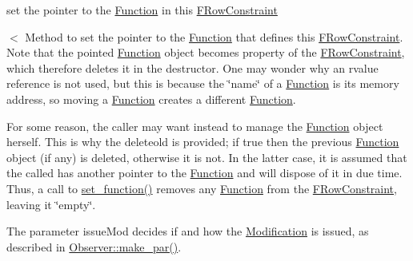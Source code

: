 set the pointer to the \mbox{\hyperlink{class_s_m_spp__di__unipi__it_1_1_function}{Function}} in this \mbox{\hyperlink{class_s_m_spp__di__unipi__it_1_1_f_row_constraint}{F\+Row\+Constraint}} 

$<$ Method to set the pointer to the \mbox{\hyperlink{class_s_m_spp__di__unipi__it_1_1_function}{Function}} that defines this \mbox{\hyperlink{class_s_m_spp__di__unipi__it_1_1_f_row_constraint}{F\+Row\+Constraint}}. Note that the pointed \mbox{\hyperlink{class_s_m_spp__di__unipi__it_1_1_function}{Function}} object becomes property of the \mbox{\hyperlink{class_s_m_spp__di__unipi__it_1_1_f_row_constraint}{F\+Row\+Constraint}}, which therefore deletes it in the destructor. One may wonder why an rvalue reference is not used, but this is because the \char`\"{}name\char`\"{} of a \mbox{\hyperlink{class_s_m_spp__di__unipi__it_1_1_function}{Function}} is its memory address, so moving a \mbox{\hyperlink{class_s_m_spp__di__unipi__it_1_1_function}{Function}} creates a different \mbox{\hyperlink{class_s_m_spp__di__unipi__it_1_1_function}{Function}}.

For some reason, the caller may want instead to manage the \mbox{\hyperlink{class_s_m_spp__di__unipi__it_1_1_function}{Function}} object herself. This is why the deleteold is provided; if true then the previous \mbox{\hyperlink{class_s_m_spp__di__unipi__it_1_1_function}{Function}} object (if any) is deleted, otherwise it is not. In the latter case, it is assumed that the called has another pointer to the \mbox{\hyperlink{class_s_m_spp__di__unipi__it_1_1_function}{Function}} and will dispose of it in due time. Thus, a call to \mbox{\hyperlink{class_s_m_spp__di__unipi__it_1_1_f_row_constraint_a91173cc091286d4bc102d8f54d564c1e}{set\+\_\+function()}} removes any \mbox{\hyperlink{class_s_m_spp__di__unipi__it_1_1_function}{Function}} from the \mbox{\hyperlink{class_s_m_spp__di__unipi__it_1_1_f_row_constraint}{F\+Row\+Constraint}}, leaving it \char`\"{}empty\char`\"{}.

The parameter issue\+Mod decides if and how the \mbox{\hyperlink{class_s_m_spp__di__unipi__it_1_1_modification}{Modification}} is issued, as described in \mbox{\hyperlink{class_s_m_spp__di__unipi__it_1_1_observer_a2d499ae38e5e95cf66cd71da32b0694a}{Observer\+::make\+\_\+par()}}. \mbox{\label{class_s_m_spp__di__unipi__it_1_1_f_row_constraint_a04d6bd47ee1aef8d3bfa2486b2732bd3}} 
